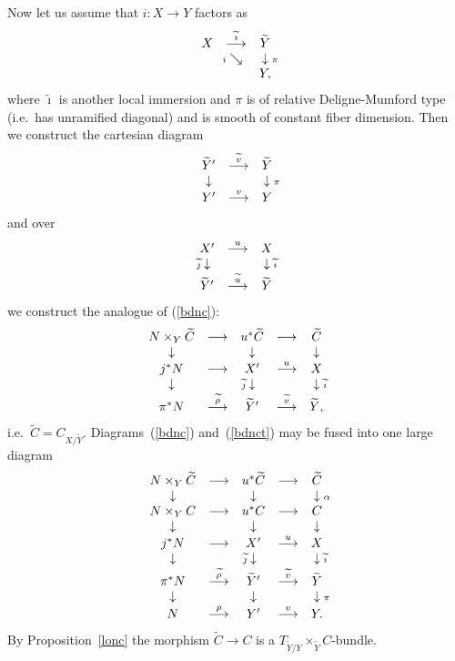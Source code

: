 \documentclass[11pt]{article}
\theoremstyle{plain}
\theoremstyle{definition}
\renewcommand{\tilde}{\widetilde}
\newcommand{\upst}{^{\ast}}
\newcommand{\ldiag}[1]
       {\makebox[0cm]{\({\scriptstyle#1}\downarrow\phantom{\scriptstyle#1}\)}}
\newcommand{\rdiag}[1]
       {\makebox[0cm]{\(\phantom{\scriptstyle#1}\downarrow{\scriptstyle#1}\)}}
\newcommand{\sediag}[1]
       {\makebox[0cm]{\({\scriptstyle#1}\searrow\phantom{\scriptstyle#1}\)}}
\newcommand{\comdia}[9]{
\begin{array}{ccc}
#1 & \stackrel{#2}{\longrightarrow} & #3 \\
\ldiag{#4} & #5 & \rdiag{#6} \\
#7 & \stackrel{#8}{\longrightarrow} & #9
\end{array}}
\newcommand{\comtri}[6]{
\begin{array}{ccc}
#1 & \stackrel{#2}{\longrightarrow} & #3         \\
   & \sediag{#4}                    & \rdiag{#5} \\
   &                                & #6
\end{array}}
\theoremstyle{plain}
\theoremstyle{definition}
\theoremstyle{remark}
\begin{document}
Now let us assume that \(i:X\rightarrow Y\) factors as
\[
\comtri{X}{\tilde{\imath}}{\tilde{Y}}{i}{\pi}{Y,}
\]
where \(\tilde{\imath}\) is another local immersion and \(\pi\) is of
relative Deligne-Mumford type (i.e.\ has unramified diagonal) and is
smooth of constant fiber dimension.  Then we construct the cartesian
diagram
\[
\comdia{\tilde{Y}'}{\tilde{v}}{\tilde{Y}}{}{}{\pi}{Y'}{v}{Y}
\]
and over
\[
\comdia{X'}{u}{X}{\tilde{\jmath}}{}{\tilde{\imath}}{\tilde{Y}'}{\tilde{u}}
{\tilde{Y}}
\]
we construct the analogue of (\ref{bdnc}):
\begin{equation} \label{bdnct}
\begin{array}{ccccc}
N\times_Y\tilde{C} & \longrightarrow & u\upst \tilde{C} &
\longrightarrow & \tilde{C} \\
\ldiag{} & & \ldiag{} & & \rdiag{} \\
j\upst N & \longrightarrow & X' & \stackrel{u}{\longrightarrow} & X \\
\ldiag{} & & \ldiag{\tilde{\jmath}} & & \rdiag{\tilde{\imath}} \\
\pi\upst N & \stackrel{\tilde{\rho}}{\longrightarrow} & \tilde{Y}' &
\stackrel{\tilde{v}}{\longrightarrow} & \tilde{Y},
\end{array}
\end{equation}
i.e.\ \(\tilde{C}=C_{X/\tilde{Y}}\). Diagrams~(\ref{bdnc})
and~(\ref{bdnct}) may be fused into one large diagram
\begin{equation} \label{bdnctt}
\begin{array}{ccccc}
N\times_Y\tilde{C} & \longrightarrow & u\upst \tilde{C} &
\longrightarrow & \tilde{C} \\
\ldiag{} & & \ldiag{} & & \rdiag{\alpha} \\
N\times_YC & \longrightarrow & u\upst C & \longrightarrow & C \\
\ldiag{} & & \ldiag{} & & \rdiag{} \\
j\upst N & \longrightarrow & X' & \stackrel{u}{\longrightarrow} & X \\
\ldiag{} & & \ldiag{\tilde{\jmath}} & & \rdiag{\tilde{\imath}} \\
\pi\upst N & \stackrel{\tilde{\rho}}{\longrightarrow} & \tilde{Y}' &
\stackrel{\tilde{v}}{\longrightarrow} & \tilde{Y} \\
\ldiag{} & & \ldiag{} & & \rdiag{\pi} \\
N & \stackrel{\rho}{\longrightarrow} & Y' &
\stackrel{v}{\longrightarrow} & Y.
\end{array}
\end{equation}
By Proposition~\ref{lonc} the morphism \(\tilde{C}\rightarrow C\) is a
\(T_{\tilde{Y}/Y}\times_{\tilde{Y}}C\)-bundle.
\end{document}
